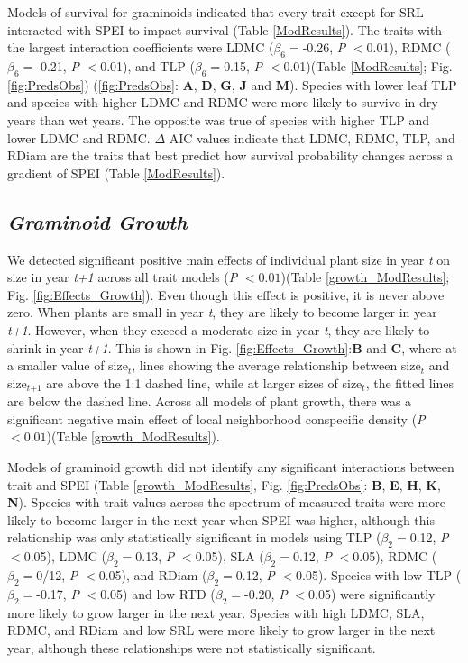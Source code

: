 \documentclass[12pt, letterpaper]{article}
\begin{document}
Models of survival for graminoids indicated that every trait except for SRL interacted with SPEI to impact survival (Table \ref{ModResults}). The traits with the largest interaction coefficients were LDMC ($\beta _6=$-0.26,  \textit{P} $<$0.01), RDMC ($\beta _6=$-0.21,  \textit{P} $<$0.01), and TLP ($\beta _6=$0.15,  \textit{P} $<$0.01)(Table \ref{ModResults}; Fig. \ref{fig:PredsObs}) (\ref{fig:PredsObs}: \textbf{A}, \textbf{D}, \textbf{G}, \textbf{J} and \textbf{M}). Species with lower leaf TLP and species with higher LDMC and RDMC were more likely to survive in dry years than wet years. The opposite was true of species with higher TLP and lower LDMC and RDMC. $\Delta$ AIC values indicate that LDMC, RDMC, TLP, and RDiam are the traits that best predict how survival probability changes across a gradient of SPEI (Table \ref{ModResults}). 

\subsection{\textit{Graminoid Growth}} 
We detected significant positive main effects of individual plant size in year \textit{t} on size in year \textit{t+1} across all trait models (\textit{P} $<0.01$)(Table \ref{growth_ModResults}; Fig. \ref{fig:Effects_Growth}). Even though this effect is positive, it is never above zero. When plants are small in year \textit{t}, they are likely to become larger in year \textit{t+1}. However, when they exceed a moderate size in year \textit{t}, they are likely to shrink in year \textit{t+1}. This is shown in Fig. \ref{fig:Effects_Growth}:\textbf{B} and \textbf{C}, where at a smaller value of size$_{\textit{t}}$, lines showing the average relationship between size$_{\textit{t}}$ and size$_{\textit{t+1}}$ are above the 1:1 dashed line, while at larger sizes of size$_{\textit{t}}$, the fitted lines are below the dashed line. Across all models of plant growth, there was a significant negative main effect of local neighborhood conspecific density (\textit{P} $<0.01$)(Table \ref{growth_ModResults}).  
 
Models of graminoid growth did not identify any significant interactions between trait and SPEI (Table \ref{growth_ModResults}, Fig. \ref{fig:PredsObs}: \textbf{B}, \textbf{E}, \textbf{H}, \textbf{K}, \textbf{N}). Species with trait values across the spectrum of measured traits were more likely to become larger in the next year when SPEI was higher, although this relationship was only statistically significant in models using TLP ($\beta _2=$0.12,  \textit{P} $<$0.05), LDMC ($\beta _2=$0.13,  \textit{P} $<$0.05), SLA ($\beta _2=$0.12,  \textit{P} $<$0.05), RDMC ($\beta _2=$0/12, \textit{P} $<$0.05), and RDiam ($\beta _2=$0.12,  \textit{P} $<$0.05). Species with low TLP ($\beta _2=$-0.17,  \textit{P} $<$0.05) and low RTD ($\beta _2=$-0.20, \textit{P} $<$0.05) were significantly more likely to grow larger in the next year. Species with high LDMC, SLA, RDMC, and RDiam and low SRL were more likely to grow larger in the next year, although these relationships were not statistically significant.  
\end{document}
